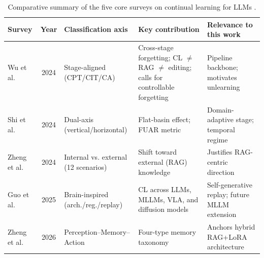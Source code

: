 \begin{table}[H]
\centering
\footnotesize
\caption{Comparative summary of the five core surveys on continual learning for LLMs \parencite{wu2024continuallearninglargelanguage, shi2024continuallearninglargelanguage, zheng2024lifelonglearninglargelanguage, guo2025continuallearninggenerativeai, 11328884}.}
\label{tab:survey_comparison}
\begin{tabularx}{\textwidth}{l c >{\raggedright\arraybackslash}p{2.7cm} X X}
\hline
\textbf{Survey} & \textbf{Year} & \textbf{Classification axis} & \textbf{Key contribution} & \textbf{Relevance to this work} \\
\hline
Wu et al.   & 2024 & Stage-aligned (CPT/CIT/CA) & Cross-stage forgetting; CL $\neq$ RAG $\neq$ editing; calls for controllable forgetting & Pipeline backbone; motivates unlearning \\
Shi et al.  & 2024 & Dual-axis (vertical/horizontal) & Flat-basin effect; FUAR metric & Domain-adaptive stage; temporal regime \\
Zheng et al.& 2024 & Internal vs. external (12 scenarios) & Shift toward external (RAG) knowledge & Justifies RAG-centric direction \\
Guo et al.  & 2025 & Brain-inspired (arch./\allowbreak reg./\allowbreak replay) & CL across LLMs, MLLMs, VLA, and diffusion models & Self-generative replay; future MLLM extension \\
Zheng et al.& 2026 & Perception--Memory--Action & Four-type memory taxonomy & Anchors hybrid RAG+LoRA architecture \\
\hline
\end{tabularx}
\end{table}


